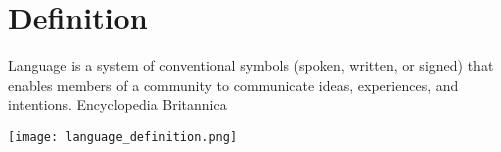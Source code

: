 




\tableofcontents
\cite{busoniu-2008-a-comprehensive-survey-of-multi-agent-reinforcement-learning}

\section{Definition}
    Language is a system of conventional symbols (spoken, written, or signed) that enables members of a community to communicate ideas, experiences, and intentions.
    Encyclopedia Britannica
    
    \texttt{[image: language\_definition.png]}




\listoftodos

